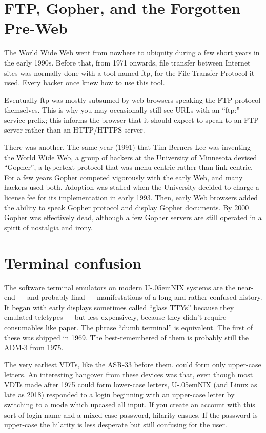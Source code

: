 \documentclass[10pt]{article}
\newcommand{\mc}{\small}
\newcommand{\acro}[1]{{\mc #1\spacefactor1000}}
\def\UNIX/{{\mc U\kern-.05emNIX\spacefactor1000}}%
\begin{document}
\section{FTP, Gopher, and the Forgotten Pre-Web}
The World Wide Web went from nowhere to ubiquity during a few short years in
the early 1990s. Before that, from 1971 onwards, file transfer between Internet
sites was normally done with a tool named ftp, for the File Transfer Protocol
it used. Every hacker once knew how to use this tool.

Eventually ftp was mostly subsumed by web browsers speaking the \acro{FTP} protocol
themselves. This is why you may occasionally still see \acro{URL}s with an ``ftp:''
service prefix; this informs the browser that it should expect to speak to an
\acro{FTP} server rather than an \acro{HTTP/HTTPS} server.

There was another. The same year (1991) that Tim Berners-Lee was inventing the
World Wide Web, a group of hackers at the University of Minnesota devised
``Gopher'', a hypertext protocol that was menu-centric rather than link-centric.
For a few years Gopher competed vigorously with the early Web, and many hackers
used both. Adoption was stalled when the University decided to charge a license
fee for its implementation in early 1993. Then, early Web browsers added the
ability to speak Gopher protocol and display Gopher documents. By 2000 Gopher
was effectively dead, although a few Gopher servers are still operated in a
spirit of nostalgia and irony.

\section{Terminal confusion}
The software terminal emulators on modern \UNIX/ systems are the near-end --- and
probably final --- manifestations of a long and rather confused history. It began
with early displays sometimes called ``glass \acro{TTY}s'' because they emulated
teletypes --- but less expensively, because they didn't require consumables like
paper. The phrase ``dumb terminal'' is equivalent. The first of these was shipped
in 1969. The best-remembered of them is probably still the \acro{ADM-3} from 1975.

The very earliest \acro{VDT}s, like the \acro{ASR-33} before them, could form only upper-case
letters. An interesting hangover from these devices was that, even though most
\acro{VDT}s made after 1975 could form lower-case letters, \UNIX/ (and Linux as late as
2018) responded to a login beginning with an upper-case letter by switching to
a mode which upcased all input. If you create an account with this sort of
login name and a mixed-case password, hilarity ensues. If the password is
upper-case the hilarity is less desperate but still confusing for the user.
\end{document}
